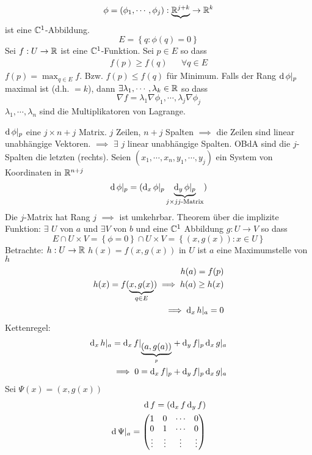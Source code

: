 \begin{Sat}
  \[\phi=(\phi_1,\cdots,\phi_j):\underbrace{\mathbb{R}^{j+k}}\rightarrow\mathbb{R}^k\]
  ist eine $\mathbb{C}^1$-Abbildung.
  \[E=\left\{ q:\phi(q)=0 \right\}\]
  Sei $f:U\rightarrow\mathbb{R}$ ist eine $\mathbb{C}^1$-Funktion. Sei $p\in E$ so dass
  \begin{align*}
    f(p)\geq f(q)&&\forall q\in E
  \end{align*}
  $f(p)=\max_{q\in E}f$. Bzw. $f(p)\leq f(q)$ für Minimum. Falls der Rang $\operatorname{d}\phi|_p$ maximal ist (d.h. $=k$), dann $\exists \lambda_1,\cdots,\lambda_k\in\mathbb{R}$ so dass
  \[\nabla f=\lambda_1\nabla \phi_1,\cdots,\lambda_j \nabla\phi_j\]
  $\lambda_1,\cdots,\lambda_n$ sind die Multiplikatoren von Lagrange.
\end{Sat}
\begin{Bew}
  $\operatorname{d}\phi|_p$ eine $j\times n+j$ Matrix. $j$ Zeilen, $n+j$ Spalten $\implies$ die Zeilen sind linear unabhängige Vektoren. $\implies$ $\exists$ $j$ linear unabhängige Spalten. OBdA sind die $j$-Spalten die letzten (rechts). Seien $(x_1,\cdots,x_n,y_1,\cdots,y_j)$ ein System von Koordinaten in $\mathbb{R}^{n+j}$
  \[\operatorname{d}\phi|_p=(\operatorname{d}_x\phi|_p\underbrace{\operatorname{d}_y\phi|_p}_{j\times j \text{$j$-Matrix}})\]
  Die $j$-Matrix hat Rang $j$ $\implies$ ist umkehrbar. Theorem über die implizite Funktion: $\exists$ $U$ von $a$ und $\exists V$ von $b$ und eine $\mathbb{C}^1$ Abbildung $g:U\to V$ so dass
  \[E\cap U\times V=\left\{ \phi=0 \right\}\cap U\times V=\left\{ (x,g(x)):x\in U \right\}\]
  Betrachte: $h:U\rightarrow\mathbb{R}$ $h(x)=f(x,g(x))$ in $U$ ist $a$ eine Maximumstelle von $h$
  \begin{eqnarray*}
    h(a)=f(p)\\
    h(x)=f(\underbrace{x,g(x)}_{q\in E})\implies h(a)\geq h(x)\\
    \implies \operatorname{d}_x h|_a=0
  \end{eqnarray*}
  Kettenregel:
  \begin{eqnarray*}
    \operatorname{d}_x h|_a=\operatorname{d}_xf|_{\underbrace{(a,g(a))}_p}+\operatorname{d}_yf|_p\operatorname{d}_xg|_a\\
    \implies 0=\operatorname{d}_xf|_p+\operatorname{d}_yf|_p\operatorname{d}_xg|_a
  \end{eqnarray*}
  Sei $\Psi(x)=(x,g(x))$
  \begin{eqnarray*}
    \operatorname{d} f=(\operatorname{d}_xf\operatorname{d}_yf)\\
    \operatorname{d}\Psi|_a = \begin{pmatrix}
      1&0&\cdots&0\\
      0&1&\cdots&0\\
      \vdots&\vdots&\vdots&\vdots\\

\end{pmatrix}
\end{eqnarray*}
\end{Bew}
